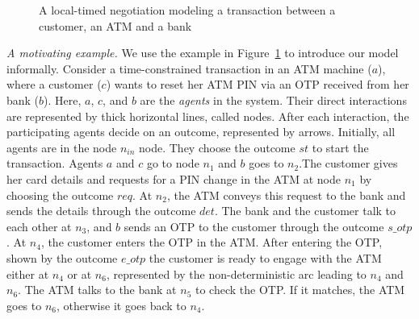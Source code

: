 \begin{figure}[t]
\caption{A local-timed negotiation modeling a transaction between a
  customer, an ATM and a bank}
\label{fig:ATM}
\end{figure}

\smallskip

\noindent\emph{A motivating example.} We use the example in Figure~\ref{fig:ATM} to introduce our model informally.  Consider a time-constrained transaction in an ATM machine ($a$), where a customer ($c$) wants to reset her ATM PIN via an OTP received from her bank ($b$).  Here, $a$, $c$, and $b$ are the \emph{agents} in the system. Their direct interactions are represented by thick horizontal lines, called nodes. After each interaction, the participating agents decide on an outcome, represented by arrows. Initially, all agents are in the node $n_{in}$ node. They choose the outcome $st$ to start the transaction. Agents $a$ and $c$ go to node $n_1$ and $b$ goes to $n_2$.The customer gives her card details and requests for a PIN change in the ATM at  node $n_1$ by choosing the outcome $req$. At $n_2$, the ATM conveys this request to the bank and sends the details through the outcome $det$. The bank and the customer talk to each other at $n_3$, and $b$ sends an OTP to the customer through the outcome $s\_otp$. At $n_4$, the customer enters the OTP in the ATM. After entering the OTP, shown by the outcome $e\_otp$ the customer is ready to engage with the ATM either at $n_4$ or at $n_6$, represented by the non-deterministic arc leading to $n_4$ and $n_6$.
The ATM talks to the bank at $n_5$ to check the OTP. If it matches,
the ATM goes to $n_6$, otherwise it goes back to $n_4$.

